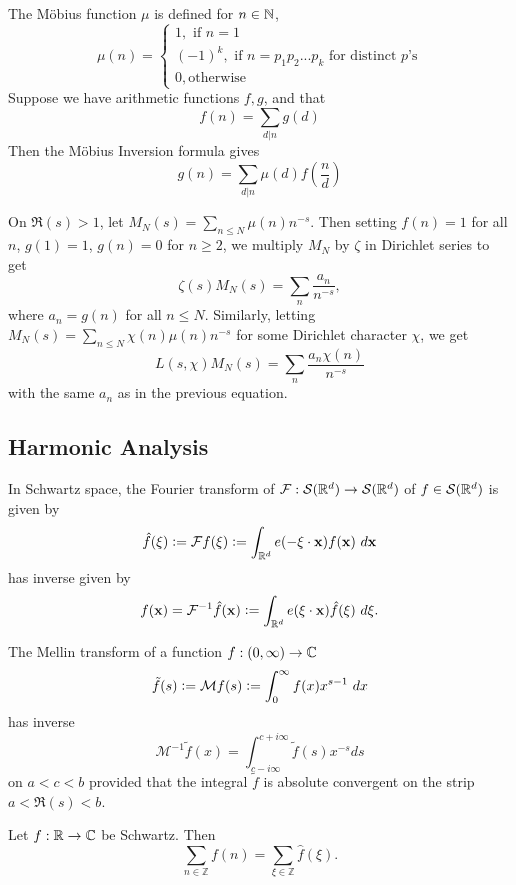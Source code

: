 \begin{theorem}
	The M\"obius function $\mu$ is defined for $n\in\mathbb{N}$,
	\[
		\mu(n) = \begin{cases}
			1, \textrm{ if } n=1\\
			(-1)^k, \textrm{ if }n=p_1p_2...p_k\textrm{ for distinct }p\textrm{'s}\\
			0, \textrm {otherwise}
		\end{cases}
	\]
	Suppose we have arithmetic functions $f,g$, and that\[
		f(n) = \sum_{d|n} g(d)
	\]
	Then the M\"obius Inversion formula gives 
	\[
		g(n) = \sum_{d|n} \mu(d) f\left(\frac{n}{d}\right)
	\]
\end{theorem}
\begin{example}
	On $\Re(s)>1$, let $M_N(s) = \sum_{n\leq N} \mu(n)n^{-s}$.
	Then setting $f(n)=1$ for all $n$, $g(1)=1$, $g(n)=0$ for $n\geq 2$, we multiply $M_N$ by $\zeta$ in Dirichlet series to get\[
		\zeta(s)M_N(s) = \sum_{n} \frac{a_n}{n^{-s}},
	\]
	where $a_n=g(n)$ for all $n\leq N$.
	Similarly, letting $M_N(s) = \sum_{n\leq N} \chi(n) \mu(n) n^{-s}$ for some Dirichlet character $\chi$,
	we get \[
		L(s,\chi)M_N(s) = \sum_{n} \frac{a_n\chi(n)}{n^{-s}}
	\]
	with the same $a_n$ as in the previous equation.
\end{example}

\subsection*{Harmonic Analysis}
\begin{theorem}
	In Schwartz space, the Fourier transform of $\mathcal{F}:\mathcal{S}(\mathbb{R}^d)\to\mathcal{S}(\mathbb{R}^d)$ of $f\in\mathcal{S}(\mathbb{R}^d)$ is given by
    \[
        \hat{f}(\mathbf{\xi})\defeq\mathcal{F}f(\mathbf{\xi})\defeq \int_{\reals^d} e(- \mathbf{\xi}\cdot \mathbf{x}) f(\mathbf{x}) \ d\mathbf{x}
    \]
    has inverse given by 
    \[
       f(\mathbf{x})= \mathcal{F}^{-1}\hat{f}(\mathbf{x})\defeq \int_{\reals^d} e(\mathbf{\xi}\cdot \mathbf{x}) \hat{f}(\mathbf{\xi}) \ d\mathbf{\xi}.
    \]
\end{theorem}
\begin{theorem}
	The Mellin transform of a function $f:(0,\infty)\to\mathbb{C}$
	\[
	\tilde{f}(s) \mathrel{\mathop:}= \mathcal{M}f(s) \mathrel{\mathop:}= \int_{0}^{\infty}f(x) x^{s-1} \ dx
	\]
	has inverse \[
	\mathcal{M}^{-1} \tilde{f} (x) = \int_{c-i\infty}^{c+i\infty} \tilde{f}(s) x^{-s}ds
	\]
	on $a<c<b$ provided that the integral $\tilde{f}$ is absolute convergent on the strip $a<\Re(s)<b$.
\end{theorem}
\begin{theorem}
	Let $f:\mathbb{R}\to\mathbb{C}$ be Schwartz. Then \[
	\sum_{n\in \mathbb{Z}} f(n) = \sum_{\xi\in\mathbb{Z}} \hat{f}(\xi).
	\]
\end{theorem}